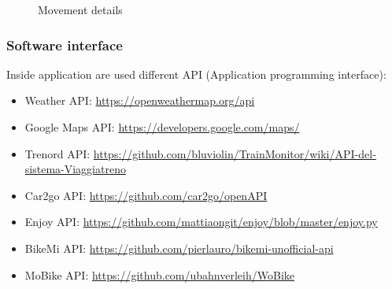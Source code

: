 \clearpage
\begin{figure}[!h]
	\centering
	\begin{minipage}[b]{0.65\textwidth}
		\caption{Movement details}
	\end{minipage}
\end{figure}
\clearpage

\subsubsection{Software interface}
Inside application are used different API (Application programming interface):
\begin{itemize}
	\item Weather API: \href{url}{https://openweathermap.org/api}
	\item Google Maps API: \href{url}{https://developers.google.com/maps/}
	\item Trenord API: \href{url}{https://github.com/bluviolin/TrainMonitor/wiki/API-del-sistema-Viaggiatreno}
	\item Car2go API: \href{url}{https://github.com/car2go/openAPI}
	\item Enjoy API: \href{url}{https://github.com/mattiaongit/enjoy/blob/master/enjoy.py}
	\item BikeMi API: \href{url}{https://github.com/pierlauro/bikemi-unofficial-api}
	\item MoBike API: \href{url}{https://github.com/ubahnverleih/WoBike}
\end{itemize}
